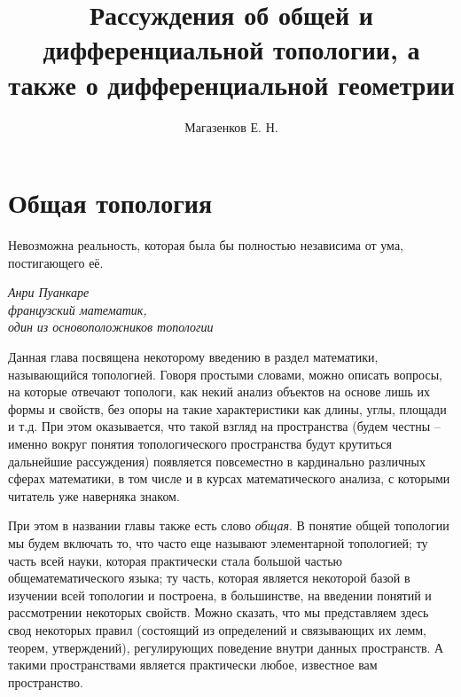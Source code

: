 \documentclass[a4paper, 12pt]{book}
\title{Рассуждения об общей и дифференциальной топологии, а также о дифференциальной геометрии}
\author{Магазенков Е. Н.}
\begin{document}
	
	\renewcommand{\contentsname}{\hfillОГЛАВЛЕНИЕ\hfill} 
	\frontmatter
	\titlepage
	
	\doublespacing
	\tableofcontents
	\let\cleardoublepage\clearpage
	\singlespacing
	
	\mainmatter
	
	\pagestyle{style}
	
	
	\chapter{Общая топология}
	\epigraph{Невозможна реальность, которая была бы полностью независима от ума, постигающего её.	\leavevmode
	}{\itshape Анри Пуанкаре\\ французский математик,\\ один из основоположников топологии}
	
    Данная глава посвящена некоторому введению в раздел математики, называющийся топологией. Говоря простыми словами, можно описать вопросы, на которые отвечают топологи, как некий анализ объектов на основе лишь их формы и свойств, без опоры на такие характеристики как длины, углы, площади и т.д. При этом оказывается, что такой взгляд на пространства (будем честны -- именно вокруг понятия топологического пространства будут крутиться дальнейшие рассуждения) появляется повсеместно в кардинально различных сферах математики, в том числе и в курсах математического анализа, с которыми читатель уже наверняка знаком. 

    При этом в названии главы также есть слово \textit{общая}. В понятие общей топологии мы будем включать то, что часто еще называют элементарной топологией; ту часть всей науки, которая практически стала большой частью общематематического языка; ту часть, которая является некоторой базой в изучении всей топологии и построена, в большинстве, на введении понятий и рассмотрении некоторых свойств. Можно сказать, что мы представляем здесь свод некоторых правил (состоящий из определений и связывающих их лемм, теорем, утверждений), регулирующих поведение внутри данных пространств. А такими пространствами является практически любое, известное вам пространство.


	
	
	
	
	
	
	
	
	
	
	
	
	
\end{document}
